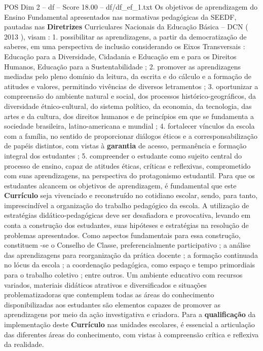 \begin{textsample}{POS Dim 2 – df – Score 18.00 – df/df\_ef\_1.txt}
Os objetivos de aprendizagem do Ensino Fundamental apresentados nas normativas pedagógicas da SEEDF, pautadas nas \textbf{Diretrizes} Curriculares Nacionais da Educação Básica – DCN ( 2013 ), visam : 1. possibilitar as aprendizagens, a partir da democratização de saberes, em uma perspectiva de inclusão considerando os Eixos Transversais : Educação para a Diversidade, Cidadania e Educação em e para os Direitos Humanos, Educação para a Sustentabilidade ; 2. promover as aprendizagens mediadas pelo pleno domínio da leitura, da escrita e do cálculo e a formação de atitudes e valores, permitindo vivências de diversos letramentos ; 3. oportunizar a compreensão do ambiente natural e social, dos processos histórico-geográficos, da diversidade étnico-cultural, do sistema político, da economia, da tecnologia, das artes e da cultura, dos direitos humanos e de princípios em que se fundamenta a sociedade brasileira, latino-americana e mundial ; 4. fortalecer vínculos da escola com a família, no sentido de proporcionar diálogos éticos e a corresponsabilização de papéis distintos, com vistas à \textbf{garantia} de acesso, permanência e formação integral dos estudantes ; 5. compreender o estudante como sujeito central do processo de ensino, capaz de atitudes éticas, críticas e reflexivas, comprometido com suas aprendizagens, na perspectiva do protagonismo estudantil.
Para que os estudantes alcancem os objetivos de aprendizagem, é fundamental que este \textbf{Currículo} seja vivenciado e reconstruído no cotidiano escolar, sendo, para tanto, imprescindível a organização do trabalho pedagógico da escola.
A utilização de estratégias didático-pedagógicas deve ser desafiadora e provocativa, levando em conta a construção dos estudantes, suas hipóteses e estratégias na resolução de problemas apresentados.
Como aspectos fundamentais para essa construção, constituem -se o Conselho de Classe, preferencialmente participativo ; a análise das aprendizagens para reorganização da prática docente ; a formação continuada no lócus da escola ; a coordenação pedagógica, como espaço e tempo primordiais para o trabalho coletivo ; entre outros.
Um ambiente educativo com recursos variados, materiais didáticos atrativos e diversificados e situações problematizadoras que contemplem todas as áreas do conhecimento disponibilizadas aos estudantes são elementos capazes de promover as aprendizagens por meio da ação investigativa e criadora.
Para a \textbf{qualificação} da implementação deste \textbf{Currículo} nas unidades escolares, é essencial a articulação das diferentes áreas do conhecimento, com vistas à compreensão crítica e reflexiva da realidade.

\end{textsample}
